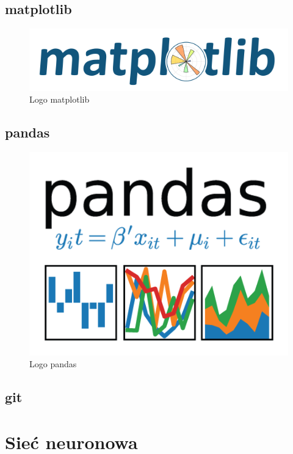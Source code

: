 \documentclass{report}
\begin{document}
    \section{matplotlib}

    \begin{figure}
        \centering
        \includegraphics[scale=0.4]{./img/matplotlib-logo.png}
        \caption{Logo matplotlib}
    \end{figure}

    \section{pandas}

    \begin{figure}
        \centering
        \includegraphics[scale=0.4]{./img/pandas-logo.png}
        \caption{Logo pandas}
    \end{figure}

    \section{git}

    \chapter{Sieć neuronowa}
\end{document}
